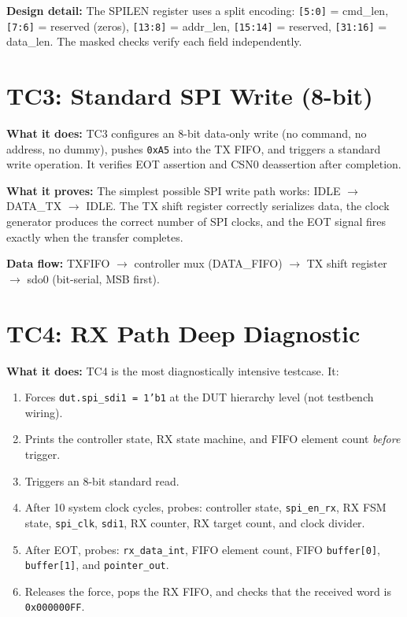 \textbf{Design detail:} The SPILEN register uses a split encoding: \texttt{[5:0]} = cmd\_len,
\texttt{[7:6]} = reserved (zeros), \texttt{[13:8]} = addr\_len, \texttt{[15:14]} = reserved,
\texttt{[31:16]} = data\_len. The masked checks verify each field independently.

\section{TC3: Standard SPI Write (8-bit)}

\textbf{What it does:} TC3 configures an 8-bit data-only write (no command, no address, no dummy),
pushes \texttt{0xA5} into the TX FIFO, and triggers a standard write operation. It verifies EOT
assertion and CSN0 deassertion after completion.

\textbf{What it proves:} The simplest possible SPI write path works:
IDLE $\rightarrow$ DATA\_TX $\rightarrow$ IDLE. The TX shift register correctly serializes data,
the clock generator produces the correct number of SPI clocks, and the EOT signal fires exactly
when the transfer completes.

\textbf{Data flow:} TXFIFO $\rightarrow$ controller mux (DATA\_FIFO) $\rightarrow$ TX shift
register $\rightarrow$ sdo0 (bit-serial, MSB first).

\section{TC4: RX Path Deep Diagnostic}
\label{sec:tc4}

\textbf{What it does:} TC4 is the most diagnostically intensive testcase. It:
\begin{enumerate}[leftmargin=2em]
  \item Forces \texttt{dut.spi\_sdi1 = 1'b1} at the DUT hierarchy level (not testbench wiring).
  \item Prints the controller state, RX state machine, and FIFO element count \emph{before} trigger.
  \item Triggers an 8-bit standard read.
  \item After 10 system clock cycles, probes: controller state, \texttt{spi\_en\_rx}, RX FSM state,
        \texttt{spi\_clk}, \texttt{sdi1}, RX counter, RX target count, and clock divider.
  \item After EOT, probes: \texttt{rx\_data\_int}, FIFO element count, FIFO \texttt{buffer[0]},
        \texttt{buffer[1]}, and \texttt{pointer\_out}.
  \item Releases the force, pops the RX FIFO, and checks that the received word is \texttt{0x000000FF}.
\end{enumerate}

